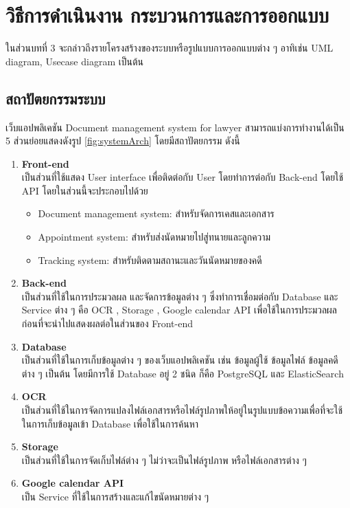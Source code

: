 \documentclass[12pt,oneside,openright,a4paper]{cpe-thai-project}
\begin{document}
\chapter{วิธีการดำเนินงาน กระบวนการและการออกแบบ}

ในส่วนบทที่ 3 จะกล่าวถึงรายโครงสร้างของระบบหรือรูปแบบการออกแบบต่าง ๆ อาทิเช่น UML diagram, Usecase diagram เป็นต้น

\section{สถาปัตยกรรมระบบ}
\hspace*{1cm} เว็บแอปพลิเคชัน Document management system for lawyer สามารถแบ่งการทำงานได้เป็น 5 ส่วนย่อยแสดงดังรูป \ref{fig:systemArch} โดยมีสถาปัตยกรรม ดังนี้
\begin{enumerate}
  \item \textbf{Front-end} \\
  \hspace*{1cm} เป็นส่วนที่ใช้แสดง User interface เพื่อติดต่อกับ User โดยทำการต่อกับ Back-end โดยใช้ API โดยในส่วนนี้จะประกอบไปด้วย
  \begin{itemize}
    \item Document management system: สำหรับจัดการเคสและเอกสาร
    \item Appointment system: สำหรับส่งนัดหมายไปสู่ทนายและลูกความ
    \item Tracking system: สำหรับติดตามสถานะและวันนัดหมายของคดี
  \end{itemize}
  \item \textbf{Back-end} \\
  \hspace*{1cm} เป็นส่วนที่ใช้ในการประมวลผล และจัดการข้อมูลต่าง ๆ ซึ่งทำการเชื่อมต่อกับ Database และ Service ต่าง ๆ คือ OCR , Storage , Google calendar API เพื่อใช้ในการประมวลผลก่อนที่จะนำไปแสดงผลต่อในส่วนของ Front-end 
  \item \textbf{Database} \\
  \hspace*{1cm} เป็นส่วนที่ใช้ในการเก็บข้อมูลต่าง ๆ ของเว็บแอปพลิเคชัน เช่น ข้อมูลผู้ใช้ ข้อมูลไฟล์ ข้อมูลคดี ต่าง ๆ เป็นต้น โดยมีการใช้ Database อยู่ 2 ชนิด ก็คือ PostgreSQL และ ElasticSearch 
  \item \textbf{OCR} \\
  \hspace*{1cm} เป็นส่วนที่ใช้ในการจัดการแปลงไฟล์เอกสารหรือไฟล์รูปภาพให้อยู่ในรูปแบบข้อความเพื่อที่จะใช้ในการเก็บข้อมูลเข้า Database เพื่อใช้ในการค้นหา
  \item \textbf{Storage} \\
  \hspace*{1cm} เป็นส่วนที่ใช้ในการจัดเก็บไฟล์ต่าง ๆ ไม่ว่าจะเป็นไฟล์รูปภาพ หรือไฟล์เอกสารต่าง ๆ 
  \item \textbf{Google calendar API} \\
  \hspace*{1cm} เป็น Service ที่ใช้ในการสร้างและแก้ไขนัดหมายต่าง ๆ
\end{enumerate}
\end{document}
